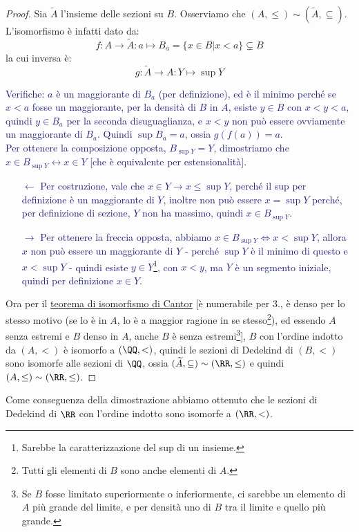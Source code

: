 \documentclass[11pt]{scrartcl}
\begin{document}
\begin{proof}
	Sia $\widetilde{A}$ l'insieme delle sezioni su $B$. Osserviamo che $(A,\leq) \sim (\widetilde{A},\subseteq)$. L'isomorfismo è infatti dato da:
	\[ f : A \rightarrow \widetilde{A} : a \mapsto B_a = \{x \in B | x < a\}\subsetneq B
		\]
	la cui inversa è:
	\[ g : \widetilde{A} \rightarrow A : Y \mapsto \sup Y
		\]
	\textcolor{MidnightBlue}{Verifiche: $a$ è un maggiorante di $B_a$ (per definizione), ed è il minimo perché se $x<a$ fosse un maggiorante, per la densità di $B$ in $A$, esiste $y \in B$ con $x<y<a$, quindi $y \in B_a$ per la
	seconda disuguaglianza, e $x<y$ non può essere ovviamente un maggiorante di $B_a$. Quindi $\sup B_a = a$, ossia $g(f(a)) = a$.\\
	Per ottenere la composizione opposta, $B_{\sup Y} = Y$, dimostriamo che $x \in B_{\sup Y} \leftrightarrow x \in Y$ [che è equivalente per estensionalità].
	\begin{itemize}
		\item[$\boxed{\longleftarrow}$] Per costruzione, vale che $x \in Y \rightarrow x \leq \sup Y$, perché il sup per definizione è un maggiorante di $Y$, inoltre 
		non può essere $x = \sup Y$ perché, per definizione di sezione, $Y$ non ha massimo, quindi $x \in B_{\sup Y}$.
		\item[$\boxed{\longrightarrow}$] Per ottenere la freccia opposta, abbiamo $x \in B_{\sup Y} \iff x < \sup Y$, allora $x$ non può essere un maggiorante di $Y$
		- perché $\sup Y$ è il minimo di questo e $x < \sup Y$ - quindi esiste $y \in Y$\footnote{Sarebbe la caratterizzazione del sup di un insieme.}, con $x < y$, ma $Y$ è un segmento iniziale, quindi per definizione $x \in Y$.
	\end{itemize}}
	Ora per il \hyperref[isoCantor]{teorema di isomorfismo di Cantor} [è numerabile per 3., è denso per lo stesso motivo (se lo è in $A$, lo è
	a maggior ragione in se stesso\footnote{Tutti gli elementi di $B$ sono anche elementi di $A$.}), ed essendo $A$ senza estremi e $B$ denso
	in $A$, anche $B$ è senza estremi\footnote{Se $B$ fosse limitato superiormente o inferiormente, ci sarebbe un elemento di $A$ più grande del
	limite, e per densità uno di $B$ tra il limite e quello più grande.}], $B$ con l'ordine indotto da $(A,<)$ è isomorfo a $(\QQ,<)$, quindi le
	sezioni di Dedekind di $(B,<)$ sono isomorfe alle sezioni di $\QQ$, ossia $(\widetilde{A},\subseteq) \sim (\RR, \leq)$ e quindi $(A,\leq) \sim (\RR,\leq)$.
\end{proof}

\begin{note}
	Come conseguenza della dimostrazione abbiamo ottenuto che le sezioni di Dedekind di $\RR$ con l'ordine indotto sono isomorfe a $(\RR,<)$.
\end{note}
\end{document}
